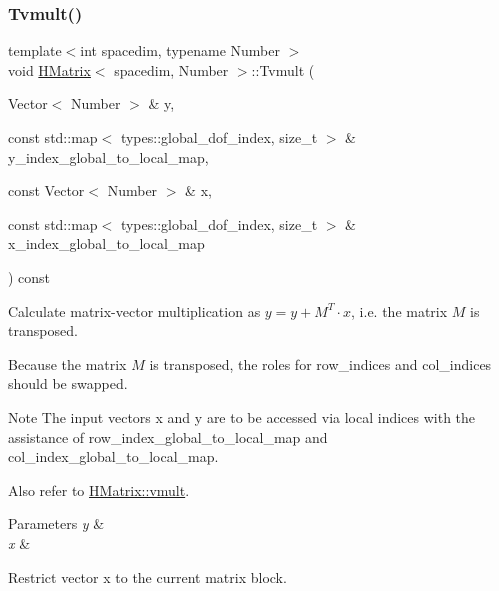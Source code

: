 \mbox{\label{classHMatrix_a52a9fb807eab3f9f0903c03dd637382c}} 
\subsubsection{\texorpdfstring{Tvmult()}{Tvmult()}\hspace{0.1cm}{\footnotesize\ttfamily [3/4]}}
{\footnotesize\ttfamily template$<$int spacedim, typename Number $>$ \\
void \hyperlink{classHMatrix}{H\+Matrix}$<$ spacedim, Number $>$\+::Tvmult (\begin{DoxyParamCaption}\item[{Vector$<$ Number $>$ \&}]{y,  }\item[{const std\+::map$<$ types\+::global\+\_\+dof\+\_\+index, size\+\_\+t $>$ \&}]{y\+\_\+index\+\_\+global\+\_\+to\+\_\+local\+\_\+map,  }\item[{const Vector$<$ Number $>$ \&}]{x,  }\item[{const std\+::map$<$ types\+::global\+\_\+dof\+\_\+index, size\+\_\+t $>$ \&}]{x\+\_\+index\+\_\+global\+\_\+to\+\_\+local\+\_\+map }\end{DoxyParamCaption}) const}

Calculate matrix-\/vector multiplication as $y = y + M^T \cdot x$, i.\+e. the matrix $M$ is transposed.

Because the matrix $M$ is transposed, the roles for {\ttfamily row\+\_\+indices} and {\ttfamily col\+\_\+indices} should be swapped.


\begin{DoxyDescription}
\item[Note ]The input vectors {\ttfamily x} and {\ttfamily y} are to be accessed via local indices with the assistance of {\ttfamily row\+\_\+index\+\_\+global\+\_\+to\+\_\+local\+\_\+map} and {\ttfamily col\+\_\+index\+\_\+global\+\_\+to\+\_\+local\+\_\+map}. 
\end{DoxyDescription}

Also refer to \hyperlink{classHMatrix_aa11b5761aba86606effd14b4bdf31912}{H\+Matrix\+::vmult}. 
\begin{DoxyParams}{Parameters}
{\em y} & \\
\hline
{\em x} & \\
\hline
\end{DoxyParams}
Restrict vector x to the current matrix block.

